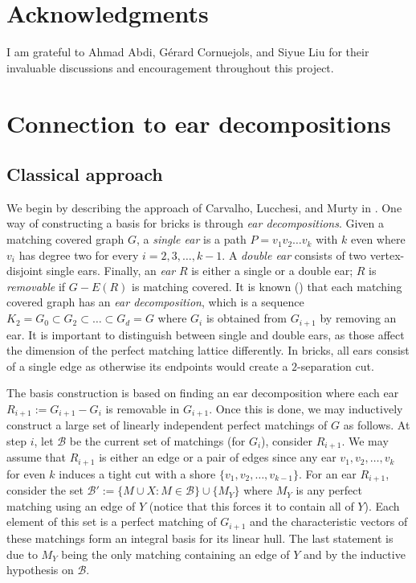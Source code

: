 \documentclass[11pt]{article}
\newcommand{\1}{\mathbf{1}}
\newcommand{\0}{\mathbf{0}}
\newcommand{\zB}{\mathcal B}
\begin{document}
\section{Acknowledgments}
I am grateful to Ahmad Abdi, G\'erard Cornuejols, and Siyue Liu for their invaluable discussions and encouragement throughout this project.




\appendix
\section{Connection to ear decompositions}

\subsection{Classical approach}\label{sec:classical}

We begin by describing the approach of Carvalho, Lucchesi, and Murty in \cite{dimension}. 
One way of constructing a basis for bricks is through \emph{ear decompositions}. Given a matching covered graph $G$, a \emph{single ear} is a path $P=v_1 v_2 \ldots v_k$ with $k$ even where $v_i$ has degree two for every $i = 2, 3, \ldots, k-1$. A \emph{double ear} consists of two vertex-disjoint single ears. Finally, an \emph{ear} $R$ is either a single or a double ear; $R$ is \emph{removable} if $G-E(R)$ is matching covered. It is known (\cite{lovaszplummer}) that each matching covered graph has an \emph{ear decomposition}, which is a sequence $K_2 = G_0\subset G_2 \subset \ldots \subset G_d = G$ where $G_i$ is obtained from $G_{i+1}$ by removing an ear. It is important to distinguish between single and double ears, as those affect the dimension of the perfect matching lattice differently. In bricks, all ears consist of a single edge as otherwise its endpoints would create a $2$-separation cut.

The basis construction is based on finding an ear decomposition where each ear $R_{i+1}:=G_{i+1}-G_i$ is removable in $G_{i+1}$. Once this is done, we may inductively construct a large set of linearly independent perfect matchings of $G$ as follows. At step $i$, let $\zB$ be the current set of matchings (for $G_i$), consider $R_{i+1}$. We may assume that $R_{i+1}$ is either an edge or a pair of edges since any ear $v_1,v_2, \ldots, v_k$ for even $k$ induces a tight cut with a shore $\{v_1,v_2, \ldots, v_{k-1}\}$. For an ear $R_{i+1}$, consider the set $\zB':=\{M\cup X: M \in \zB\} \cup \{M_Y\}$ where $M_Y$ is any perfect matching using an edge of $Y$ (notice that this forces it to contain all of $Y$). Each element of this set is a perfect matching of $G_{i+1}$ and the characteristic vectors of these matchings form an integral basis for its linear hull. The last statement is due to $M_Y$ being the only matching containing an edge of $Y$ and by the inductive hypothesis on $\zB$.
\end{document}
